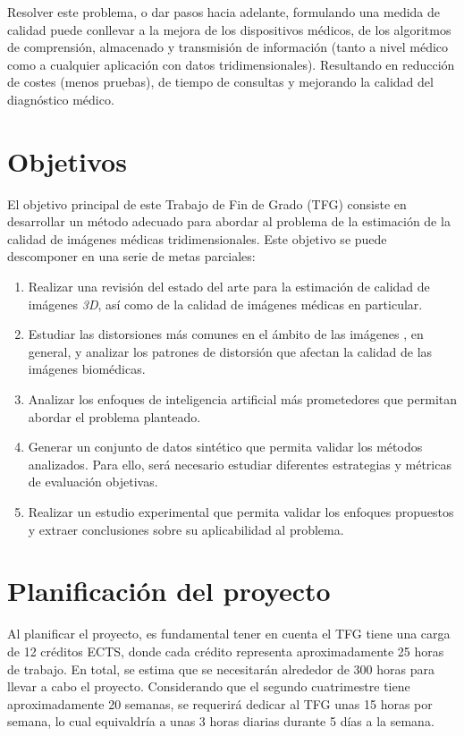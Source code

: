 Resolver este problema, o dar pasos hacia adelante, formulando una medida de calidad
puede conllevar a la mejora de los dispositivos médicos, de los algoritmos de comprensión, almacenado 
y transmisión de información (tanto a nivel médico como a cualquier 
aplicación con datos tridimensionales).
Resultando en reducción de costes (menos pruebas), de tiempo de consultas y 
mejorando la calidad del diagnóstico médico. 

\section{Objetivos}
El objetivo principal de este Trabajo de Fin de Grado (TFG) 
consiste en desarrollar un método adecuado para abordar al 
problema de la estimación de la calidad de imágenes médicas tridimensionales. 
Este objetivo se puede descomponer en una serie de metas parciales: 
\begin{enumerate}
  \item Realizar una revisión del estado del arte para la estimación de calidad 
    de imágenes \emph{3D}, así como de la calidad de imágenes médicas en particular.
  \item Estudiar las distorsiones más comunes en el ámbito de las imágenes
    , en general, y analizar los patrones de distorsión que afectan la calidad de las imágenes 
    biomédicas.
  \item Analizar los enfoques de inteligencia artificial más prometedores que permitan abordar el problema planteado. 
  \item Generar un conjunto de datos sintético que permita validar 
    los métodos analizados. Para ello, será necesario estudiar diferentes 
    estrategias y métricas de evaluación objetivas\cite{ResSCNN}.
  \item Realizar un estudio experimental que permita validar los enfoques 
    propuestos y extraer conclusiones sobre su aplicabilidad al problema. 
\end{enumerate}
\section{Planificación del proyecto}
Al planificar el proyecto, es fundamental tener en cuenta el TFG 
tiene una carga de 12 créditos ECTS, donde cada 
crédito representa aproximadamente 25 horas de trabajo. 
En total, se estima que se necesitarán alrededor de 300 horas para llevar a cabo 
el proyecto. Considerando que el segundo cuatrimestre tiene aproximadamente 20 semanas, 
se requerirá dedicar al TFG unas 15 horas por semana, lo cual equivaldría a unas 3 horas 
diarias durante 5 días a la semana.
 
